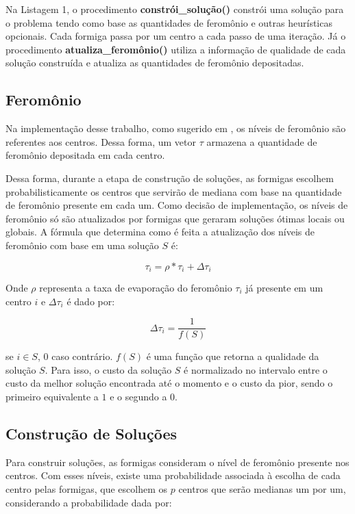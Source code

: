 \documentclass[12pt]{article}
\begin{document}
Na Listagem 1, o procedimento \textbf{constrói\_solução()} constrói uma solução para o problema tendo
como base as quantidades de feromônio e outras heurísticas opcionais. Cada formiga passa por um centro
a cada passo de uma iteração. Já o procedimento \textbf{atualiza\_feromônio()} utiliza a informação 
de qualidade de cada solução construída e atualiza as quantidades de feromônio depositadas.

\subsection{Feromônio}

Na implementação desse trabalho, como sugerido em \cite{dblp:fr}, os níveis
de feromônio são referentes aos centros. Dessa forma, um vetor $ \tau $ armazena a quantidade de feromônio
depositada em cada centro.

Dessa forma, durante a etapa de construção de soluções, as formigas escolhem probabilisticamente os centros
que servirão de mediana com base na quantidade de feromônio presente em cada um. Como decisão de implementação,
os níveis de feromônio só são atualizados por formigas que geraram soluções ótimas locais ou globais. A fórmula
que determina como é feita a atualização dos níveis de feromônio com base em uma solução $ S $ é:

\begin{displaymath}
 \tau_i = \rho * \tau_i + \Delta\tau_i
\end{displaymath}

Onde $ \rho $ representa a taxa de evaporação do feromônio $ \tau_i $ já presente em um centro $ i $ e
$ \Delta\tau_i $ é dado por:

\begin{displaymath}
 \Delta\tau_i = \frac{1}{f(S)} 
\end{displaymath}

se $ i \in S $, $ 0 $ caso contrário. $ f(S) $ é uma função que retorna a qualidade da solução $ S $.
Para isso, o custo da solução $ S $ é normalizado no intervalo entre o custo da melhor solução encontrada
até o momento e o custo da pior, sendo o primeiro equivalente a $ 1 $ e o segundo a $ 0 $.

\subsection{Construção de Soluções}

Para construir soluções, as formigas consideram o nível de feromônio presente nos centros. Com esses níveis,
existe uma probabilidade associada à escolha de cada centro pelas formigas, que escolhem os $ p $ centros
que serão medianas um por um, considerando a probabilidade dada por:
\end{document}
